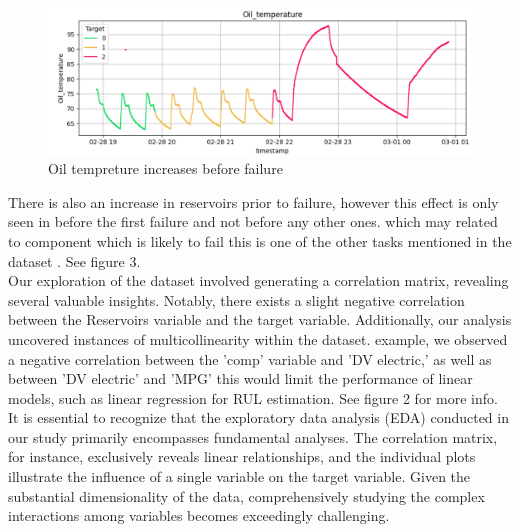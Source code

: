 \documentclass{article}
\begin{document}
\begin{figure}
    \centering
    \includegraphics[width=1\textwidth]{EDA_oil.png}
    \caption{Oil tempreture increases before failure}
    \label{fig:Oil temp}
\end{figure}

There is also an increase in reservoirs prior to failure, however this effect is only seen in before the first failure and not before any other ones. which may related to component which is likely to fail this is one of the other tasks mentioned in the dataset \cite{Veloso2022}. See figure 3. \\

Our exploration of the dataset involved generating a correlation matrix, revealing several valuable insights. Notably, there exists a slight negative correlation between the Reservoirs variable and the target variable. Additionally, our analysis uncovered instances of multicollinearity within the dataset. example, we observed a negative correlation between the 'comp' variable and 'DV electric,' as well as between 'DV electric' and 'MPG' this would limit the performance of linear models, such as linear regression for RUL estimation. See figure 2 for more info.\\

It is essential to recognize that the exploratory data analysis (EDA) conducted in our study primarily encompasses fundamental analyses. The correlation matrix, for instance, exclusively reveals linear relationships, and the individual plots illustrate the influence of a single variable on the target variable. Given the substantial dimensionality of the data, comprehensively studying the complex interactions among variables becomes exceedingly challenging. \\
\end{document}
